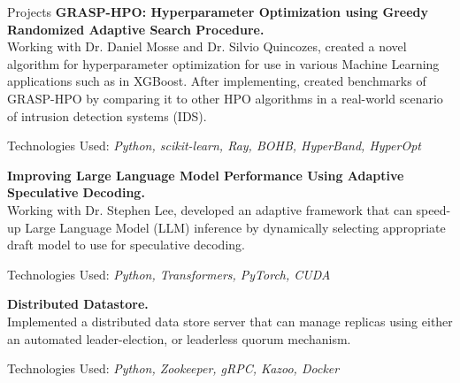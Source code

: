 \begin{rSection}{Projects}
    \textbf{GRASP-HPO: Hyperparameter Optimization using Greedy Randomized Adaptive Search Procedure.}\\
    {Working with Dr. Daniel Mosse and Dr. Silvio Quincozes, created a novel algorithm for hyperparameter optimization for use in various Machine Learning applications such as in XGBoost. After implementing, created benchmarks of GRASP-HPO by comparing it to other HPO algorithms in a real-world scenario of intrusion detection systems (IDS).}
    \begin{description}\vspace{-0.5em}
        \item Technologies Used: \textit{Python, scikit-learn, Ray, BOHB, HyperBand, HyperOpt}
    \end{description}

    \textbf{Improving Large Language Model Performance Using Adaptive Speculative Decoding.}\\
    {Working with Dr. Stephen Lee, developed an adaptive framework that can speed-up Large Language Model (LLM) inference by dynamically selecting appropriate draft model to use for speculative decoding.}
    \begin{description}\vspace{-0.5em}
        \item Technologies Used: \textit{Python, Transformers, PyTorch, CUDA}
    \end{description}

    \textbf{Distributed Datastore.}\\
    {Implemented a distributed data store server that can manage replicas using either an automated leader-election, or leaderless quorum mechanism.}
    \begin{description}\vspace{-0.5em}
        \item Technologies Used: \textit{Python, Zookeeper, gRPC, Kazoo, Docker}
    \end{description}


\end{rSection}
